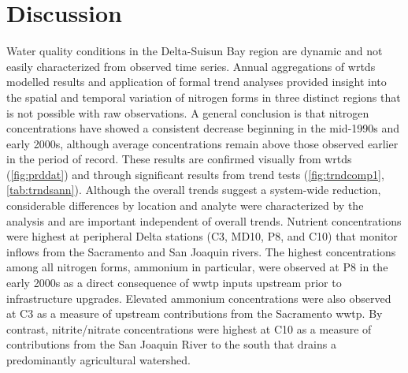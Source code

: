\documentclass[letterpaper,12pt,oneside]{article}\usepackage[]{graphicx}\usepackage[]{color}
\begin{document}
\section{Discussion}

Water quality conditions in the Delta-Suisun Bay region are dynamic and not easily characterized from observed time series.  Annual aggregations of \ac{wrtds} modelled results and application of formal trend analyses provided insight into the spatial and temporal variation of nitrogen forms in three distinct regions that is not possible with raw observations.  A general conclusion is that nitrogen concentrations have showed a consistent decrease beginning in the mid-1990s and early 2000s, although average concentrations remain above those observed earlier in the period of record.  These results are confirmed visually from \ac{wrtds} (\cref{fig:prddat}) and through significant results from trend tests (\cref{fig:trndcomp1}, \cref{tab:trndsann}).  Although the overall trends suggest a system-wide reduction, considerable differences by location and analyte were characterized by the analysis and are important independent of overall trends.  Nutrient concentrations were highest at peripheral Delta stations (C3, MD10, P8, and C10) that monitor inflows from the Sacramento and San Joaquin rivers.  The highest concentrations among all nitrogen forms, ammonium in particular, were observed at P8 in the early 2000s as a direct consequence of \ac{wwtp} inputs upstream prior to infrastructure upgrades.  Elevated ammonium concentrations were also observed at C3 as a measure of upstream contributions from the Sacramento \ac{wwtp}.  By contrast, nitrite/nitrate concentrations were highest at C10 as a measure of contributions from the San Joaquin River to the south that drains a predominantly agricultural watershed.
\end{document}
